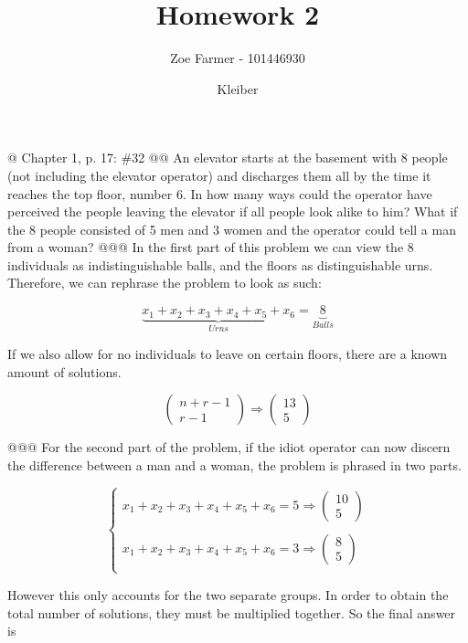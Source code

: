 \documentclass[10pt]{article}
\title{Homework 2}
\date{Kleiber}
\author{Zoe Farmer - 101446930}
\begin{document}
\maketitle

\begin{easylist}[enumerate]
    @ Chapter 1, p. 17: \#32
    @@ An elevator starts at the basement with 8 people (not including the elevator operator) and discharges them all by the time it reaches the top floor, number 6. In how many ways could the operator have perceived the people leaving the elevator if all people look alike to him? What if the 8 people consisted of 5 men and 3 women and the operator could tell a man from a woman?
    @@@ In the first part of this problem we can view the 8 individuals as indistinguishable balls, and the floors as distinguishable urns. Therefore, we can rephrase the problem to look as such:

    \[ \underbrace{x_1 + x_2 + x_3 + x_4 + x_5 + x_6}_{Urns} = \underbrace{8}_{Balls} \]

    If we also allow for no individuals to leave on certain floors, there are a known amount of solutions.

    \[ \begin{pmatrix}n + r - 1\\ r - 1\end{pmatrix} \Rightarrow \boxed{\begin{pmatrix}13\\5\end{pmatrix}} \]

    @@@ For the second part of the problem, if the idiot operator can now discern the difference between a man and a woman, the problem is phrased in two parts.

    \[ \begin{cases}
            x_1 + x_2 + x_3 + x_4 + x_5 + x_6 = 5 \Rightarrow \begin{pmatrix}10\\5\end{pmatrix}\\\\
            x_1 + x_2 + x_3 + x_4 + x_5 + x_6 = 3 \Rightarrow \begin{pmatrix}8\\5\end{pmatrix}\\
    \end{cases} \]

    However this only accounts for the two separate groups. In order to obtain the total number of solutions, they must be multiplied together. So the final answer is


\end{easylist}
\end{document}
